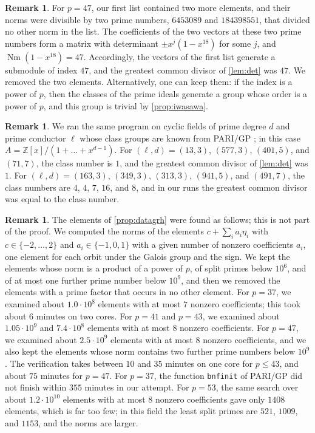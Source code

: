 \documentclass[11pt]{amsart}
\theoremstyle{plain}
\theoremstyle{definition}
\newtheorem{remark}[theorem]{Remark}
\begin{document}
\begin{remark} \label{rem:index}
For $p = 47$, our first list contained two more elements, and their norms were divisible by two prime numbers, $6453089$ and $184398551$, that divided no other norm in the list.
The coefficients of the two vectors at these two prime numbers form a matrix with determinant $\pm x^j (1 - x^{18})$ for some $j$, and $\operatorname{Nm}(1 - x^{18}) = 47$.
Accordingly, the vectors of the first list generate a submodule of index $47$, and the greatest common divisor of \cref{lem:det} was $47$.
We removed the two elements.
Alternatively, one can keep them: if the index is a power of $p$, then the classes of the prime ideals generate a group whose order is a power of $p$, and this group is trivial by \cref{prop:iwasawa}.
\end{remark}

\begin{remark} \label{rem:control}
We ran the same program on cyclic fields of prime degree $d$ and prime conductor $\ell$ whose class groups are known from PARI/GP \cite{PARI}; in this case $A = \mathbb{Z}[x]/(1 + \dots + x^{d-1})$.
For $(\ell, d) = (13, 3)$, $(577, 3)$, $(401, 5)$, and $(71, 7)$, the class number is $1$, and the greatest common divisor of \cref{lem:det} was $1$.
For $(\ell, d) = (163, 3)$, $(349, 3)$, $(313, 3)$, $(941, 5)$, and $(491, 7)$, the class numbers are $4$, $4$, $7$, $16$, and $8$, and in our runs the greatest common divisor was equal to the class number.
\end{remark}

\begin{remark} \label{rem:searchgrh}
The elements of \cref{prop:datagrh} were found as follows; this is not part of the proof.
We computed the norms of the elements $c + \sum_i a_i \eta_i$ with $c \in \{-2, \dots, 2\}$ and $a_i \in \{-1, 0, 1\}$ with a given number of nonzero coefficients $a_i$, one element for each orbit under the Galois group and the sign.
We kept the elements whose norm is a product of a power of $p$, of split primes below $10^6$, and of at most one further prime number below $10^9$, and then we removed the elements with a prime factor that occurs in no other element.
For $p = 37$, we examined about $1.0 \cdot 10^8$ elements with at most $7$ nonzero coefficients; this took about $6$ minutes on two cores.
For $p = 41$ and $p = 43$, we examined about $1.05 \cdot 10^9$ and $7.4 \cdot 10^8$ elements with at most $8$ nonzero coefficients.
For $p = 47$, we examined about $2.5 \cdot 10^9$ elements with at most $8$ nonzero coefficients, and we also kept the elements whose norm contains two further prime numbers below $10^9$.
The verification takes between $10$ and $35$ minutes on one core for $p \le 43$, and about $75$ minutes for $p = 47$.
For $p = 37$, the function \texttt{bnfinit} of PARI/GP did not finish within $355$ minutes in our attempt.
For $p = 53$, the same search over about $1.2 \cdot 10^{10}$ elements with at most $8$ nonzero coefficients gave only $1408$ elements, which is far too few; in this field the least split primes are $521$, $1009$, and $1153$, and the norms are larger.
\end{remark}
\end{document}
